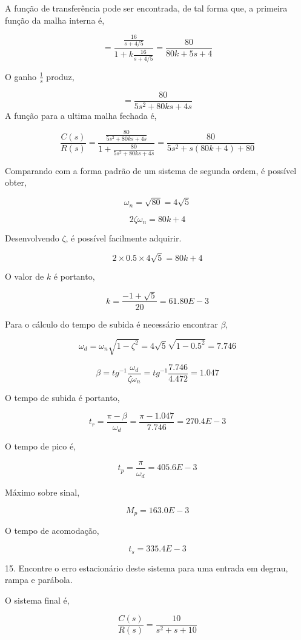 \documentclass[paper=a4, fontsize=11pt]{article}
\begin{document}
A função de transferência pode ser encontrada, de tal forma que, a primeira
função da malha interna é,

$$
= \frac{\frac{16}{s+4/5}}{1 + k \frac{16}{s+4/5}} = \frac{80}{80 k + 5 s + 4}
$$

O ganho $\frac{1}{s}$ produz,

$$
= \frac{80}{5 s^2 + 80 k s + 4 s}
$$
A função para a ultima malha fechada é,

$$
\frac{C(s)}{R(s)} = \frac{\frac{80}{5 s^2 + 80 k s + 4 s}}{1 + \frac{80}{5 s^2 + 80 k s + 4 s}} = \frac{80}{5 s^2 + s(80 k + 4) + 80}
$$

Comparando com a forma padrão de um sistema de segunda ordem, é possível obter,

$$
\omega_n = \sqrt{80} = 4 \sqrt{5}
$$

$$
2 \zeta \omega_n = 80 k + 4
$$

Desenvolvendo $\zeta$, é possível facilmente adquirir.

$$
2 \times 0.5 \times 4 \sqrt{5} = 80 k + 4
$$

O valor de $k$ é portanto,

$$
k = \frac{-1 + \sqrt{5}}{20} = 61.80E-3
$$

Para o cálculo do tempo de subida é necessário encontrar $\beta$,

$$
\omega_d = \omega_n \sqrt{1 - \zeta^2} = 4 \sqrt{5} \sqrt{1 - 0.5^2} = 7.746
$$

$$
\beta = tg^{-1}\frac{\omega_d}{\zeta \omega_n} = tg^{-1}\frac{7.746}{4.472} = 1.047
$$

O tempo de subida é portanto,

$$
t_r = \frac{\pi - \beta}{\omega_d} = \frac{\pi - 1.047}{7.746} = 270.4E-3
$$

O tempo de pico é,

$$
t_p = \frac{\pi}{\omega_d} = 405.6E-3
$$

Máximo sobre sinal,

$$
M_p = 163.0E-3
$$

O tempo de acomodação,

$$
t_s  = 335.4E-3
$$


\newpage

15. Encontre o erro estacionário deste sistema para uma entrada em degrau, rampa e parábola.

O sistema final é,

$$
\frac{C(s)}{R(s)} = \frac{10}{s^2 +  s + 10}
$$
\end{document}
